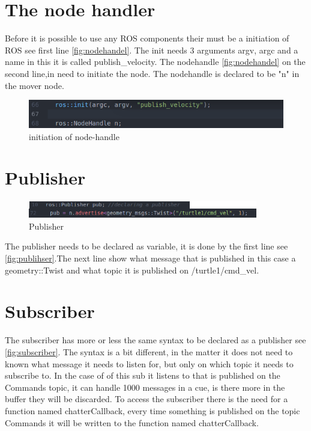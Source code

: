 \section{The node handler}
Before it is possible to use any ROS components their must be a initiation of ROS see first line \ref{fig:nodehandel}. The init needs 3 arguments argv, argc and a name in this it is called publish\_velocity. The nodehandle \ref{fig:nodehandel} on the second line,in need to initiate the node. The nodehandle is declared to be "n" in the mover node.
\begin{figure}[h]
\begin{center}
\includegraphics[width=.9\textwidth]{figures/nodehandel.png}
\caption{initiation of node-handle}
\end{center}
\end{figure}\label{fig:nodehandel}


\section{Publisher}
\begin{figure}[h]
\begin{center}
\includegraphics[width=.9\textwidth]{figures/publisher.png}
\caption{Publisher}
\end{center}
\end{figure}\label{fig:publihser}
The publisher needs to be declared as variable, it is done by the first line see \ref{fig:publihser}.The next line show what message that is published in this case a geometry::Twist and what topic it is published on /turtle1/cmd\_vel.


\section{Subscriber}
The subscriber has more or less the same syntax to be declared as a publisher see \ref{fig:subscriber}. The syntax is a bit different, in the matter it does not need to known what message it needs to listen for, but only on which topic it needs to subscribe to. In the case of of this sub it listens to that is published on the Commands topic, it can handle 1000 messages in a cue, is there more in the buffer they will be discarded. To access the subscriber there is the need for a function named chatterCallback, every time something is published on the topic Commands it will be written to the function named chatterCallback.

